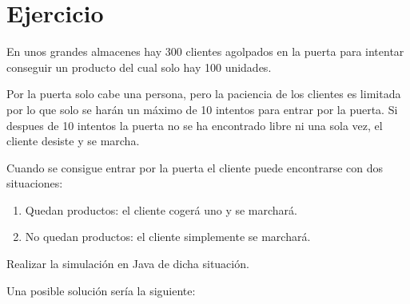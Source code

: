 \documentclass[letterpaper,10pt,spanish]{sphinxmanual}
\begin{document}
\section{Ejercicio}
\label{\detokenize{textos/tema2:ejercicio}}
En unos grandes almacenes hay 300 clientes agolpados en la puerta para intentar conseguir un producto del cual solo hay 100 unidades.

Por la puerta solo cabe una persona, pero la paciencia de los clientes es limitada por lo que solo se harán un máximo de 10 intentos para entrar por la puerta. Si despues de 10 intentos la puerta no se ha encontrado libre ni una sola vez, el cliente desiste y se marcha.

Cuando se consigue entrar por la puerta el cliente puede encontrarse con dos situaciones:
\begin{enumerate}
%
\item {} 
Quedan productos: el cliente cogerá uno y se marchará.

\item {} 
No quedan productos: el cliente simplemente se marchará.

\end{enumerate}

Realizar la simulación en Java de dicha situación.

Una posible solución sería la siguiente:
\end{document}
